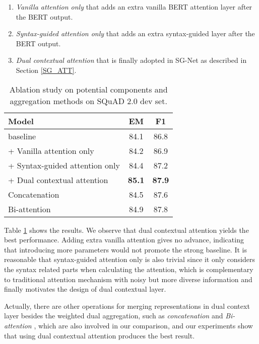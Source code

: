 \documentclass[letterpaper]{article} \usepackage{color}
\begin{document}
\begin{enumerate}
    \item \emph{Vanilla attention only} that adds an extra vanilla BERT attention layer after the BERT output.
    \item \emph{Syntax-guided attention only} that adds an extra syntax-guided layer after the BERT output.
    \item \emph{Dual contextual attention} that is finally adopted in SG-Net as described in Section \ref{SG_ATT}.
\end{enumerate}

\begin{table}
	\centering
	
	\begin{tabular}{l c c}
		\hline
		
		\hline
		\textbf{Model} & \textbf{EM} & \textbf{F1}\\
		\hline
		baseline & 84.1 & 86.8 \\
		+ Vanilla attention only & 84.2 &  86.9 \\
		+ Syntax-guided attention only & 84.4 & 87.2  \\
		+ Dual contextual attention & \textbf{85.1} & \textbf{87.9} \\
		\hdashline
		Concatenation &   84.5  & 87.6 \\	
		Bi-attention & 84.9 & 87.8\\
		\hline
	\end{tabular}
	
	\caption{\label{tab:ablation} Ablation study on potential components and aggregation methods on SQuAD 2.0 dev set.}
\end{table}

Table \ref{tab:ablation} shows the results. We observe that dual contextual attention yields the best performance. Adding extra vanilla attention gives no advance, indicating that introducing more parameters would not promote the strong baseline. It is reasonable that syntax-guided attention only is also trivial since it only considers the syntax related parts when calculating the attention, which is complementary to traditional attention mechanism with noisy but more diverse information and finally motivates the design of dual contextual layer. 

Actually, there are other operations for merging representations in dual context layer besides the weighted dual aggregation, such as \emph{concatenation} and \emph{Bi-attention} \cite{Seo2016Bidirectional}, which are also involved in our comparison, and our experiments show that using dual contextual attention produces the best result.
\end{document}
